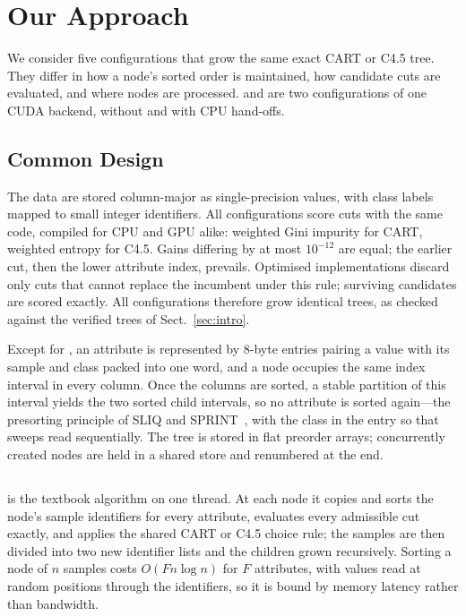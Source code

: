 \section{Our Approach}
\label{sec:impl}

We consider five configurations that grow the same exact CART or C4.5 tree. They differ in how a node's sorted order is maintained, how candidate cuts are evaluated, and where nodes are processed. \ImplGpu{} and \ImplHybrid{} are two configurations of one CUDA backend, without and with CPU hand-offs.

\subsection{Common Design}
\label{sec:impl-common}

The data are stored column-major as single-precision values, with class labels mapped to small integer identifiers. All configurations score cuts with the same code, compiled for CPU and GPU alike: weighted Gini impurity for CART, weighted entropy for C4.5. Gains differing by at most $10^{-12}$ are equal; the earlier cut, then the lower attribute index, prevails. Optimised implementations discard only cuts that cannot replace the incumbent under this rule; surviving candidates are scored exactly. All configurations therefore grow identical trees, as checked against the verified trees of Sect.~\ref{sec:intro}.

Except for \ImplSerialBase{}, an attribute is represented by 8-byte entries pairing a value with its sample and class packed into one word, and a node occupies the same index interval in every column. Once the columns are sorted, a stable partition of this interval yields the two sorted child intervals, so no attribute is sorted again---the presorting principle of SLIQ and SPRINT~\cite{mehta1996sliq,shafer1996sprint}, with the class in the entry so that sweeps read sequentially. The tree is stored in flat preorder arrays; concurrently created nodes are held in a shared store and renumbered at the end.

\subsection{\ImplSerialBase}
\label{sec:impl-simple}

\ImplSerialBase{} is the textbook algorithm on one thread. At each node it copies and sorts the node's sample identifiers for every attribute, evaluates every admissible cut exactly, and applies the shared CART or C4.5 choice rule; the samples are then divided into two new identifier lists and the children grown recursively. Sorting a node of $n$ samples costs $O(F n \log n)$ for $F$ attributes, with values read at random positions through the identifiers, so it is bound by memory latency rather than bandwidth.

